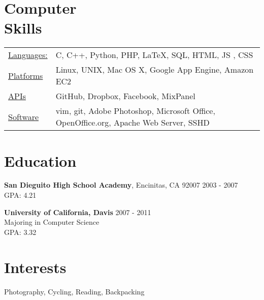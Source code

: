 \documentclass[margin]{res}
\begin{document}
\begin{resume}
\section{Computer \\ Skills}
   \begin{tabular}{l p{3in}}
   \underline{Languages:} & C, C++, Python, PHP, \LaTeX, SQL, HTML, JS , CSS  \\
   \underline{Platforms} & Linux, UNIX, Mac OS X, Google App Engine, Amazon EC2\\
   \underline{APIs} & GitHub, Dropbox, Facebook, MixPanel\\
   \underline{Software} & vim, git, Adobe Photoshop, Microsoft Office, OpenOffice.org, Apache Web Server, SSHD\\

 \end{tabular}

\section{Education} 
{\bf San Dieguito High School Academy}, Encinitas, CA 92007 \hfill 2003 - 2007 \\
 GPA: 4.21

{\bf University of California, Davis}  \hfill 2007 - 2011\\
Majoring in Computer Science \\
GPA: 3.32

\section{Interests}
Photography, Cycling, Reading, Backpacking

\end{resume} 
\end{document}
